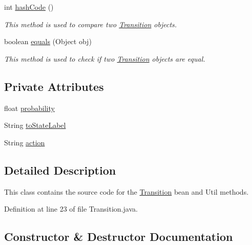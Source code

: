 \begin{DoxyCompactItemize}
int \hyperlink{classese_1_1seas_1_1upenn_1_1edu_1_1_transition_a6ef52b94cb2f06593fff3144d9db61fb}{hash\+Code} ()
\begin{DoxyCompactList}\small\item\em This method is used to compare two \hyperlink{classese_1_1seas_1_1upenn_1_1edu_1_1_transition}{Transition} objects. \end{DoxyCompactList}\item 
boolean \hyperlink{classese_1_1seas_1_1upenn_1_1edu_1_1_transition_a704a4dd99037e7a33b79d1d785210d67}{equals} (Object obj)
\begin{DoxyCompactList}\small\item\em This method is used to check if two \hyperlink{classese_1_1seas_1_1upenn_1_1edu_1_1_transition}{Transition} objects are equal. \end{DoxyCompactList}\end{DoxyCompactItemize}
\subsection*{Private Attributes}
\begin{DoxyCompactItemize}
\item 
float \hyperlink{classese_1_1seas_1_1upenn_1_1edu_1_1_transition_a1972203fb78b0b9a43d758e5b127a04d}{probability}
\item 
String \hyperlink{classese_1_1seas_1_1upenn_1_1edu_1_1_transition_a90ad793f29c7da83bccc4de524b9a28d}{to\+State\+Label}
\item 
String \hyperlink{classese_1_1seas_1_1upenn_1_1edu_1_1_transition_a8c04b30e9c745a0d3e0420c3ae80f77a}{action}
\end{DoxyCompactItemize}


\subsection{Detailed Description}
This class contains the source code for the \hyperlink{classese_1_1seas_1_1upenn_1_1edu_1_1_transition}{Transition} bean and Util methods. 



Definition at line 23 of file Transition.\+java.



\subsection{Constructor \& Destructor Documentation}
\hypertarget{classese_1_1seas_1_1upenn_1_1edu_1_1_transition_ae400900946cce4a3eed16807cc4c4aac}{}
